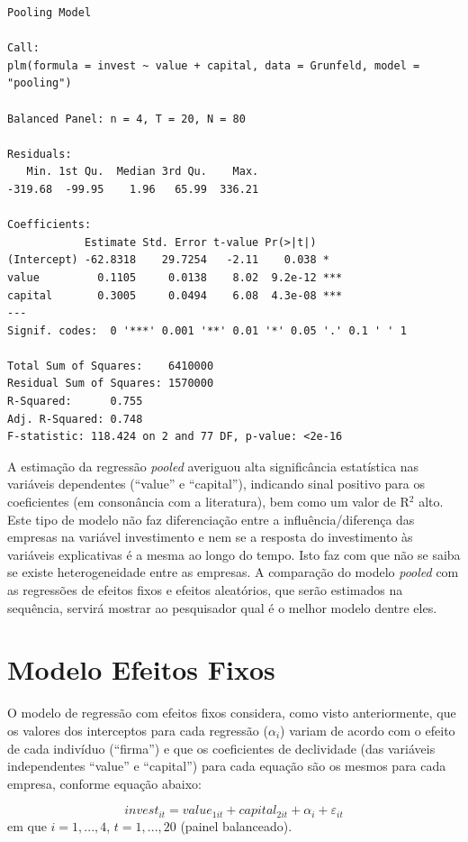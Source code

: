 \documentclass[12pt,brazil,oneside]{book}
\begin{document}
\begin{verbatim}
Pooling Model

Call:
plm(formula = invest ~ value + capital, data = Grunfeld, model = "pooling")

Balanced Panel: n = 4, T = 20, N = 80

Residuals:
   Min. 1st Qu.  Median 3rd Qu.    Max. 
-319.68  -99.95    1.96   65.99  336.21 

Coefficients:
            Estimate Std. Error t-value Pr(>|t|)    
(Intercept) -62.8318    29.7254   -2.11    0.038 *  
value         0.1105     0.0138    8.02  9.2e-12 ***
capital       0.3005     0.0494    6.08  4.3e-08 ***
---
Signif. codes:  0 '***' 0.001 '**' 0.01 '*' 0.05 '.' 0.1 ' ' 1

Total Sum of Squares:    6410000
Residual Sum of Squares: 1570000
R-Squared:      0.755
Adj. R-Squared: 0.748
F-statistic: 118.424 on 2 and 77 DF, p-value: <2e-16
\end{verbatim}

A estimação da regressão \emph{pooled} averiguou alta significância estatística nas variáveis dependentes (``value'' e ``capital''), indicando sinal positivo para os coeficientes (em consonância com a literatura), bem como um valor de R\(^2\) alto. Este tipo de modelo não faz diferenciação entre a influência/diferença das empresas na variável investimento e nem se a resposta do investimento às variáveis explicativas é a mesma ao longo do tempo. Isto faz com que não se saiba se existe heterogeneidade entre as empresas. A comparação do modelo \emph{pooled} com as regressões de efeitos fixos e efeitos aleatórios, que serão estimados na sequência, servirá mostrar ao pesquisador qual é o melhor modelo dentre eles.

\hypertarget{modelo-efeitos-fixos}{%
\section{Modelo Efeitos Fixos}\label{modelo-efeitos-fixos}}

O modelo de regressão com efeitos fixos considera, como visto anteriormente, que os valores dos interceptos para cada regressão (\(\alpha_i\)) variam de acordo com o efeito de cada indivíduo (``firma'') e que os coeficientes de declividade (das variáveis independentes ``value'' e ``capital'') para cada equação são os mesmos para cada empresa, conforme equação abaixo:

\[
invest_{it} = value_{1it} + capital_{2it} + \alpha_i + \varepsilon_{it}
\]
em que \(i=1,...,4\), \(t=1,...,20\) (painel balanceado).
\end{document}
